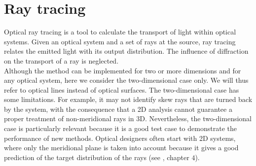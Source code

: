 \chapter{Ray tracing}\label{chap:raytracing}
Optical ray tracing is a tool to calculate the transport of light within optical systems.
Given an optical system and a set of rays at the source, ray tracing relates the emitted light with its output distribution. 
The influence of diffraction on the transport of a ray is neglected. \\ \indent
Although the method can be implemented for two or more dimensions and for any optical system, here we consider the two-dimensional case only. 
We will thus refer to optical lines instead of optical surfaces.
The two-dimensional case has some limitations. For example, it may not identify skew rays that are turned back by the system, with the consequence that a 2D analysis cannot guarantee a proper treatment of non-meridional rays in 3D. 
Nevertheless, the two-dimensional case is particularly relevant because it is a good test case to demonstrate the performance of new methods.
Optical designers often start with 2D systems, where only the meridional plane is taken into account because it gives a good prediction of the target distribution of the rays
(see \cite{winston2005nonimaging}, chapter $4$).
